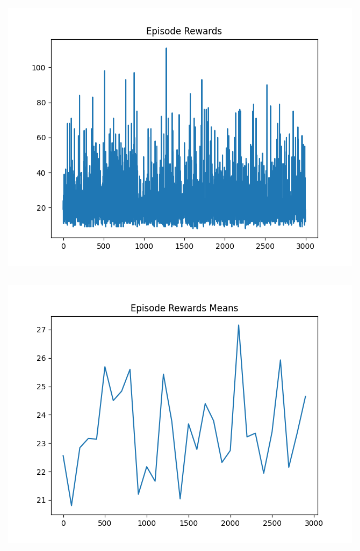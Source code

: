 \begin{figure}[H]
    \centering
    \begin{subfigure}{.47\linewidth}
        \centering
        \includegraphics[width=\textwidth]{pole/2024-06-13_18-59-17_dqn_cartpole_episode_rewards.png}
    \end{subfigure}
    \begin{subfigure}{.47\linewidth}
        \centering
        \includegraphics[width=\textwidth]{pole/2024-06-13_18-59-17_dqn_cartpole_episode_rewards_means.png}
    \end{subfigure}
    \begin{subfigure}{.47\linewidth}
        \centering

\end{subfigure}
\end{figure}
